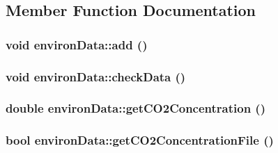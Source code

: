 \subsection{Member Function Documentation}
\hypertarget{classenviron_data_abcedca793f5ec608308cc9594d85cf29}{
\subsubsection[{add}]{\setlength{\rightskip}{0pt plus 5cm}void environData::add ()}}
\label{classenviron_data_abcedca793f5ec608308cc9594d85cf29}
\hypertarget{classenviron_data_a0c00314bcd9f27d8bfb01546dea811ca}{
\subsubsection[{checkData}]{\setlength{\rightskip}{0pt plus 5cm}void environData::checkData ()}}
\label{classenviron_data_a0c00314bcd9f27d8bfb01546dea811ca}
\hypertarget{classenviron_data_a514d2fee4098d8d6649d5002b1fc4a09}{
\subsubsection[{getCO2Concentration}]{\setlength{\rightskip}{0pt plus 5cm}double environData::getCO2Concentration ()}}
\label{classenviron_data_a514d2fee4098d8d6649d5002b1fc4a09}
\hypertarget{classenviron_data_a2fda4cce089fa81c1225e2e12f51db74}{
\subsubsection[{getCO2ConcentrationFile}]{\setlength{\rightskip}{0pt plus 5cm}bool environData::getCO2ConcentrationFile ()}}
\label{classenviron_data_a2fda4cce089fa81c1225e2e12f51db74}
